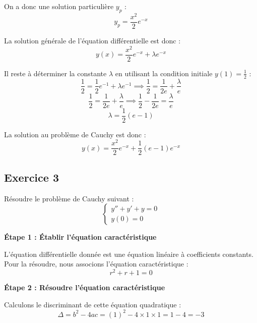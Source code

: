 \documentclass{article}
\begin{document}
On a donc une solution particulière $y_{p}$ :
\begin{equation*}
y_{p} = \frac{x^2}{2}e^{-x}
\end{equation*}

La solution générale de l'équation différentielle est donc :
\begin{equation*}
y(x) = \frac{x^2}{2}e^{-x} + \lambda e^{-x}
\end{equation*}

Il reste à déterminer la constante $\lambda$ en utilisant la condition initiale $y(1) = \frac{1}{2}$ :
\begin{equation*}
\frac{1}{2} = \frac{1}{2}e^{-1} + \lambda e^{-1} \implies \frac{1}{2} = \frac{1}{2e} + \frac{\lambda}{e}
\end{equation*}
\begin{equation*}
\frac{1}{2} = \frac{1}{2e} + \frac{\lambda}{e} \implies \frac{1}{2} - \frac{1}{2e} = \frac{\lambda}{e}
\end{equation*}
\begin{equation*}
\lambda = \frac{1}{2}(e - 1)
\end{equation*}

La solution au problème de Cauchy est donc :
\begin{equation*}
y(x) = \frac{x^2}{2}e^{-x} + \frac{1}{2}(e - 1)e^{-x}
\end{equation*}

\subsection{Exercice 3}
Résoudre le problème de Cauchy suivant :
\begin{equation*}
\begin{cases}
    y'' + y' + y = 0  \\
    y(0)=0
\end{cases}
\end{equation*}

\textbf{Étape 1 : Établir l'équation caractéristique}

L'équation différentielle donnée est une équation linéaire à coefficients constants. Pour la résoudre, nous associons l'équation caractéristique :
\begin{equation*}
r^2 + r + 1 = 0
\end{equation*}

\textbf{Étape 2 : Résoudre l'équation caractéristique}

Calculons le discriminant de cette équation quadratique :
\begin{equation*}
\Delta = b^2 - 4ac = (1)^2 - 4 \times 1 \times 1 = 1 - 4 = -3
\end{equation*}
\end{document}

